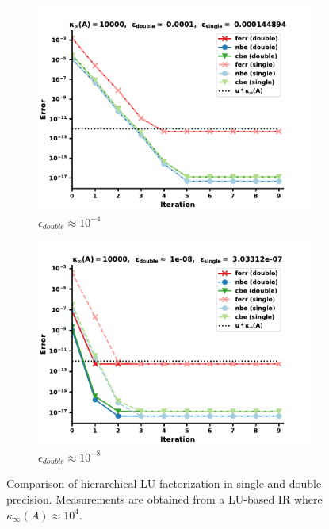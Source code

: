 \begin{figure}
\centering
\begin{subfigure}{.5\textwidth}
  \centering
  \includegraphics[width=\linewidth]{chapters/5_experiments/figures/LU512_e1_0s.pdf}
  \caption{$\epsilon_{double} \approx 10^{-4}$}
  \label{fig:lrirs2_1}
\end{subfigure}%
\begin{subfigure}{.5\textwidth}
  \centering
  \includegraphics[width=\linewidth]{chapters/5_experiments/figures/LU512_e1_1s.pdf}
  \caption{$\epsilon_{double} \approx 10^{-8}$}
  \label{fig:lrirs2_2}
\end{subfigure}
\caption[Mixed Precision Low-Rank LU-IR 2]{Comparison of hierarchical LU factorization in single and double precision. Measurements are obtained from a LU-based IR where $\kappa_\infty(A) \approx 10^4$.}
\label{fig:lrirs2}
\end{figure}

